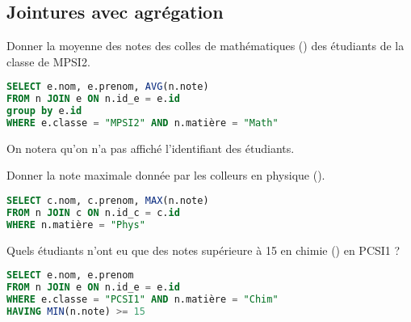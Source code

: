 \subsection{Jointures avec agrégation} 
\begin{Exercise}
Donner la moyenne des notes des colles de mathématiques () des étudiants de la classe de MPSI2.
\end{Exercise}
\begin{Answer}
\begin{lstlisting}[language=SQL]
SELECT e.nom, e.prenom, AVG(n.note)
FROM n JOIN e ON n.id_e = e.id
group by e.id
WHERE e.classe = "MPSI2" AND n.matière = "Math"
\end{lstlisting}
On notera qu'on n'a pas affiché l'identifiant des étudiants.
\end{Answer}
\begin{Exercise}
Donner la note maximale donnée par les colleurs en physique  ().
\end{Exercise}
\begin{Answer}
\begin{lstlisting}[language=SQL]
SELECT c.nom, c.prenom, MAX(n.note)
FROM n JOIN c ON n.id_c = c.id
WHERE n.matière = "Phys"
\end{lstlisting}
\end{Answer}
\begin{Exercise}
Quels étudiants n'ont eu que des notes supérieure à 15 en chimie () en PCSI1 ?
\end{Exercise}
\begin{Answer}
\begin{lstlisting}[language=SQL]
SELECT e.nom, e.prenom
FROM n JOIN e ON n.id_e = e.id
WHERE e.classe = "PCSI1" AND n.matière = "Chim"
HAVING MIN(n.note) >= 15
\end{lstlisting}
\end{Answer}
